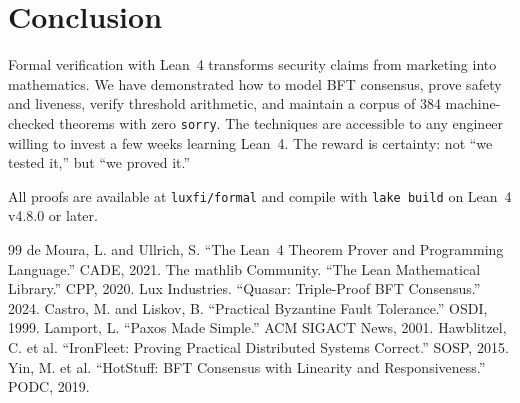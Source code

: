 \section{Conclusion}


Formal verification with Lean~4 transforms security claims from marketing into
mathematics. We have demonstrated how to model BFT consensus, prove safety and liveness,
verify threshold arithmetic, and maintain a corpus of 384 machine-checked theorems with
zero \texttt{sorry}. The techniques are accessible to any engineer willing to invest
a few weeks learning Lean~4. The reward is certainty: not ``we tested it,'' but ``we
proved it.''

All proofs are available at \texttt{luxfi/formal} and compile with \texttt{lake build}
on Lean~4 v4.8.0 or later.

\begin{thebibliography}{99}
 de Moura, L. and Ullrich, S. ``The Lean~4 Theorem Prover and Programming Language.'' CADE, 2021.
 The mathlib Community. ``The Lean Mathematical Library.'' CPP, 2020.
 Lux Industries. ``Quasar: Triple-Proof BFT Consensus.'' 2024.
 Castro, M. and Liskov, B. ``Practical Byzantine Fault Tolerance.'' OSDI, 1999.
 Lamport, L. ``Paxos Made Simple.'' ACM SIGACT News, 2001.
 Hawblitzel, C. et al. ``IronFleet: Proving Practical Distributed Systems Correct.'' SOSP, 2015.
 Yin, M. et al. ``HotStuff: BFT Consensus with Linearity and Responsiveness.'' PODC, 2019.
\end{thebibliography}


